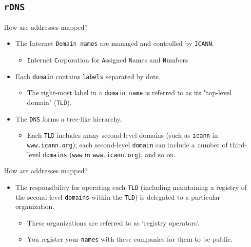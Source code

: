 \documentclass[xcolor=table]{beamer}
\begin{document}
\subsection{\texttt{rDNS}}
\begin{frame}{How are addresses mapped?}
  \begin{itemize}
    \item The Internet \texttt{Domain names} are managed and controlled by \texttt{ICANN}.
      \begin{itemize}
        \item \texttt{I}nternet \texttt{C}orporation for \texttt{A}ssigned \texttt{N}ames and \texttt{N}umbers
      \end{itemize}
    \item Each \texttt{domain} contains \texttt{labels} separated by dots.
      \begin{itemize}
        \item The right-most label in a \texttt{domain name} is referred to as its "top-level domain" (\texttt{TLD}).
      \end{itemize}
    \item The \texttt{DNS} forms a tree-like hierarchy. 
      \begin{itemize}
        \item Each \texttt{TLD} includes many second-level domains (such as \texttt{icann} in \texttt{www.icann.org}); each second-level \texttt{domain} can include a number of third-level \texttt{domains} (\texttt{www} in \texttt{www.icann.org}), and so on.
      \end{itemize}
  \end{itemize}
\end{frame}

\begin{frame}{How are addresses mapped?}
  \begin{itemize}
    \item The responsibility for operating each \texttt{TLD} (including maintaining a registry of the second-level \texttt{domains} within the \texttt{TLD}) is delegated to a particular organization. 
      \begin{itemize}
        \item These organizations are referred to as `registry operators'.
        \item You register your \texttt{names} with these companies for them to be public.
      \end{itemize}
  \end{itemize}
\end{frame}
\end{document}

